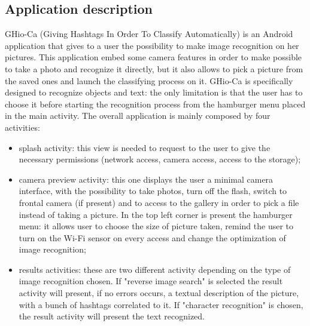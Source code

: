 \subsection{Application description}
GHio-Ca (Giving Hashtags In Order To Classify Automatically) is an Android 
application that gives to a user the possibility to make image recognition on 
her pictures. This application embed some camera features in order to make 
possible to take a photo and recognize it directly, but it also allows to pick 
a picture from the saved ones and launch the classifying process on it.
GHio-Ca is specifically designed to recognize objects and text: the only 
limitation is that the user has to choose it before starting the 
recognition process from the hamburger menu placed in the main activity. 
The overall application is mainly composed by four activities:
\begin{itemize}
  \item splash activity: this view is needed to request to the user to give 
    the necessary permissions (network access, camera access, access to 
    the storage);
  \item camera preview activity: this one displays the user a minimal 
    camera interface, with the possibility to take photos, turn off the 
    flash, switch to frontal camera (if present) and to access to the 
    gallery in order to pick a file instead of taking a picture. In the 
    top left corner is present the hamburger menu: it allows user to 
    choose the size of picture taken, remind the user to turn on the Wi-Fi 
    sensor on every access and change the optimization of image recognition;
  \item results activities: these are two different activity depending on 
    the type of image recognition chosen. If "reverse image search" is 
    selected the result activity will present, if no errors occurs, a 
    textual description of the picture, with a bunch of hashtags correlated
    to it. If "character recognition" is chosen, the result activity will 
    present the text recognized.
\end{itemize}
